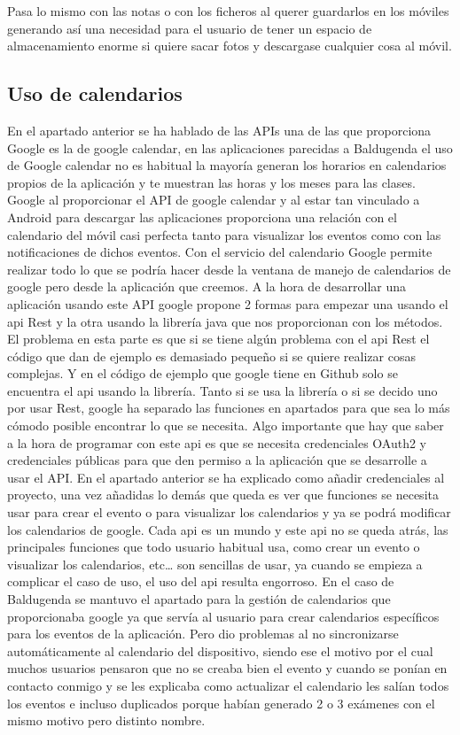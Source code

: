 Pasa lo mismo con las notas o con los ficheros al querer guardarlos en los móviles generando así una necesidad para el usuario de tener un espacio de almacenamiento enorme si quiere sacar fotos y descargase cualquier cosa al móvil.

\subsection{Uso de calendarios}
\label{subsecc:Uso de calendarios}

En el apartado anterior se ha hablado de las APIs  una de las que proporciona Google es la de google calendar, en las aplicaciones parecidas a Baldugenda el uso de Google calendar no es habitual la mayoría generan los horarios en calendarios propios de la aplicación y te muestran las horas y los meses para las clases.
Google al proporcionar el API de google calendar y al estar tan vinculado a Android para descargar las aplicaciones proporciona una relación con el calendario del móvil casi perfecta tanto para visualizar los eventos como con las notificaciones de dichos eventos.
Con el servicio del calendario Google permite realizar todo lo que se podría hacer desde la ventana de manejo de calendarios de google pero desde la aplicación que creemos.
A la hora de desarrollar una aplicación usando este API google propone 2 formas para empezar una usando el api Rest y la otra usando la librería java que nos proporcionan con los métodos.
El problema en esta parte es que si se tiene algún problema con el api Rest el código que dan de ejemplo es demasiado pequeño si se quiere realizar cosas complejas. Y en el código de ejemplo que google tiene en Github solo se encuentra el api usando la librería.
Tanto si se usa la librería o si se decido uno por usar Rest, google ha separado las funciones en apartados para que sea lo más cómodo posible encontrar lo que se necesita.
Algo importante que hay que saber a la hora de programar con este api es que se necesita credenciales OAuth2 y credenciales públicas para que den permiso a la aplicación que se desarrolle a usar el API.
En el apartado anterior se ha explicado como añadir credenciales al proyecto, una vez añadidas lo demás que queda es ver que funciones se necesita usar para crear el evento o para visualizar los calendarios y ya se podrá modificar los calendarios de google.
Cada api es un mundo y este api no se queda atrás, las principales funciones que todo usuario habitual usa, como crear un evento o visualizar los calendarios, etc… son sencillas de usar, ya cuando se empieza a complicar el caso de uso, el uso del api resulta engorroso.
En el caso de Baldugenda se mantuvo el apartado para la gestión de calendarios que proporcionaba google ya que servía al usuario para crear calendarios específicos para los eventos de la aplicación. Pero dio problemas al no sincronizarse automáticamente al calendario del dispositivo, siendo ese el motivo por el cual muchos usuarios pensaron que no se creaba bien el evento y cuando se ponían en contacto conmigo y se les explicaba como actualizar el calendario les salían todos los eventos e incluso duplicados porque habían generado 2 o 3 exámenes con el mismo motivo pero distinto nombre.

